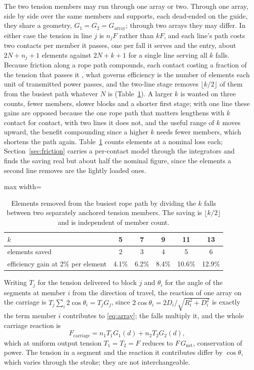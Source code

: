\documentclass[preprint,12pt,number]{elsarticle}
\newcommand{\Gnet}{G_{\mathrm{net}}}
\newcommand{\Garr}{G_{\mathrm{array}}}
\begin{document}
The two tension members may run through one array or two. Through one array, side by side over the same members and supports, each dead-ended on the guide, they share a geometry, $G_1 = G_2 = \Garr$; through two arrays they may differ. In either case the tension in line $j$ is $n_j F$ rather than $kF$, and each line's path costs two contacts per member it passes, one per fall it serves and the entry, about $2N + n_j + 1$ elements against $2N + k + 1$ for a single line serving all $k$ falls. Because friction along a rope path compounds, each contact costing a fraction of the tension that passes it \citep{jung2008,feyrer2015}, what governs efficiency is the number of elements each unit of transmitted power passes, and the two-line stage removes $\lfloor k/2 \rfloor$ of them from the busiest path whatever $N$ is (Table~\ref{tab:contacts}). A larger $k$ is wanted on three counts, fewer members, slower blocks and a shorter first stage; with one line these gains are opposed because the one rope path that matters lengthens with $k$ contact for contact, with two lines it does not, and the useful range of $k$ moves upward, the benefit compounding since a higher $k$ needs fewer members, which shortens the path again. Table~\ref{tab:contacts} counts elements at a nominal loss each; Section~\ref{sec:friction} carries a per-contact model through the integrators and finds the saving real but about half the nominal figure, since the elements a second line removes are the lightly loaded ones.

\begin{table}[H]
\centering
\caption{Elements removed from the busiest rope path by dividing the $k$ falls between two separately anchored tension members. The saving is $\lfloor k/2 \rfloor$ and is independent of member count.}
\label{tab:contacts}
\begin{adjustbox}{max width=\linewidth}
\begin{tabular}{lccccc}
\toprule
$k$ & 5 & 7 & 9 & 11 & 13 \\
\midrule
elements saved & 2 & 3 & 4 & 5 & 6 \\
efficiency gain at 2\% per element & 4.1\% & 6.2\% & 8.4\% & 10.6\% & 12.9\% \\
\bottomrule
\end{tabular}
\end{adjustbox}
\end{table}

Writing $T_j$ for the tension delivered to block $j$ and $\theta_i$ for the angle of the segments at member $i$ from the direction of travel, the reaction of one array on the carriage is $T_j\sum_i 2\cos\theta_i = T_j G_j$, since $2\cos\theta_i = 2D_i/\sqrt{R_i^2 + D_i^2}$ is exactly the term member $i$ contributes to \eqref{eq:array}; the falls multiply it, and the whole carriage reaction is
\begin{equation}
F_{\mathrm{carriage}} = n_1 T_1 G_1(d) + n_2 T_2 G_2(d),
\label{eq:carriage}
\end{equation}
which at uniform output tension $T_1 = T_2 = F$ reduces to $F\,\Gnet$, conservation of power. The tension in a segment and the reaction it contributes differ by $\cos\theta$, which varies through the stroke; they are not interchangeable.
\end{document}
